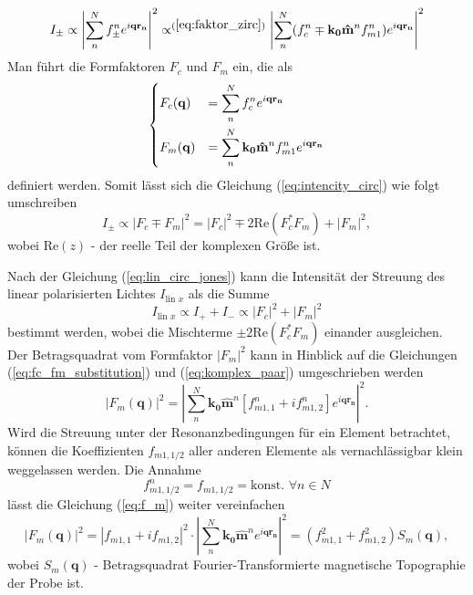 \begin{equation}
    I_{\pm} \propto \left| \sum_{n}^N f_{\pm}^n e^{i\mathbf{qr_n}} \right|^2 \propto^{(\ref{eq:faktor_zirc})} \left| \sum_{n}^N (f_{c}^n\mp \mathbf{k_0}\mathbf{\hat{m}}^n f_{m1}^n) e^{i\mathbf{qr_n}} \right|^2
    \label{eq:intencity_circ}
\end{equation}
Man führt die Formfaktoren $F_c$ und $F_m$ ein, die als
\begin{equation}
    \begin{dcases}
     F_c(\mathbf{q}) &= \sum^N_n f_c^n e^{i\mathbf{qr_n}}\\
     F_m(\mathbf{q}) &= \sum^N_n \mathbf{k_0}\mathbf{\hat{m}}^n f_{m1}^n e^{i\mathbf{qr_n}}
    \end{dcases}
    \label{eq:fc_fm_substitution}
\end{equation}
definiert werden. Somit lässt sich die Gleichung (\ref{eq:intencity_circ}) wie folgt umschreiben
\begin{equation}
     I_{\pm} \propto \left| F_c \mp F_m \right|^2 = \left| F_c \right|^2 \mp 2\text{Re}(F_c^*F_m) + \left| F_m \right|^2,
\end{equation}
wobei $\text{Re}(z)$ - der reelle Teil der komplexen Größe ist.

\noindent
Nach der Gleichung (\ref{eq:lin_circ_jones}) kann die Intensität der Streuung des linear polarisierten Lichtes $I_{\text{lin $x$}}$ als die Summe
\begin{equation}
    I_{\text{lin $x$}} \propto I_+ + I_- \propto  \left| F_c \right|^2 + \left| F_m \right|^2
\end{equation}
bestimmt werden, wobei die Mischterme $\pm2\text{Re}(F_c^*F_m)$ einander ausgleichen. Der Betragsquadrat vom Formfaktor $\left|F_m\right|^2$ kann in Hinblick auf die Gleichungen (\ref{eq:fc_fm_substitution}) und (\ref{eq:komplex_paar}) umgeschrieben werden
\begin{equation}
    \left|F_m(\mathbf{q})\right|^2 =  \left|\sum^N_n \mathbf{k_0}\mathbf{\hat{m}}^n \left[f_{m1,1}^n + if_{m1,2}^n\right] e^{i\mathbf{qr_n}}\right|^2.
    \label{eq:f_m}
\end{equation}
Wird die Streuung unter der Resonanzbedingungen für ein Element betrachtet, können die Koeffizienten $f_{m1,1/2}$ aller anderen Elemente als vernachlässigbar klein weggelassen werden. Die Annahme
\begin{equation}
    f_{m1,1/2}^n = f_{m1,1/2} = \text{konst. } \forall n \in N
\end{equation}
lässt die Gleichung (\ref{eq:f_m}) weiter vereinfachen
\begin{equation}
   \left|F_m(\mathbf{q})\right|^2 = \left|f_{m1,1} + if_{m1,2}\right|^2 \cdot \left|\sum^N_n \mathbf{k_0}\mathbf{\hat{m}}^n e^{i\mathbf{qr_n}}\right|^2 = (f_{m1,1}^2 + f_{m1,2}^2)S_m(\mathbf{q}),
\end{equation}
wobei $S_m(\mathbf{q})$ - Betragsquadrat Fourier-Transformierte magnetische Topographie der Probe ist.


